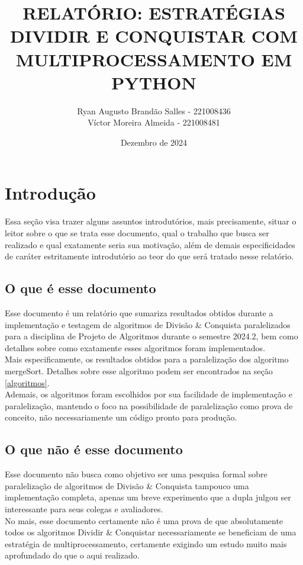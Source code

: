 \documentclass{article}
\title{RELATÓRIO: ESTRATÉGIAS DIVIDIR E CONQUISTAR COM MULTIPROCESSAMENTO EM PYTHON}
\author{
    Ryan Augusto Brandão Salles - 221008436\\
    Víctor Moreira Almeida - 221008481\\
}
\date{Dezembro de 2024}
\begin{document}
\maketitle

\section{Introdução}
Essa seção visa trazer alguns assuntos introdutórios, mais precisamente, situar o leitor sobre o que se trata esse documento, qual o trabalho que busca ser realizado e qual exatamente seria sua motivação, além de demais especificidades de caráter estritamente introdutório ao teor do que será tratado nesse relatório.

\subsection{O que é esse documento}
Esse documento é um relatório que sumariza resultados obtidos durante a implementação e testagem de algoritmos de Divisão \& Conquista paralelizados para a disciplina de Projeto de Algoritmos durante o semestre 2024.2, bem como detalhes sobre como exatamente esses algoritmos foram implementados.\\
Mais especificamente, os resultados obtidos para a paralelização dos algoritmo mergeSort. Detalhes sobre esse algoritmo podem ser encontrados na seção \ref{algoritmos}.\\
Ademais, os algoritmos foram escolhidos por sua facilidade de implementação e paralelização, mantendo o foco na possibilidade de paralelização como prova de conceito, não necessariamente um código pronto para produção.\\

\subsection{O que não é esse documento}
Esse documento não busca como objetivo ser uma pesquisa formal sobre paralelização de algoritmos de Divisão \& Conquista tampouco uma implementação completa, apenas um breve experimento que a dupla julgou ser interessante para seus colegas e avaliadores.\\
No mais, esse documento certamente não é uma prova de que absolutamente todos os algoritmos Dividir \& Conquistar necessariamente se beneficiam de uma estratégia de multiprocessamento, certamente exigindo um estudo muito mais aprofundado do que o aqui realizado.\\
\end{document}
